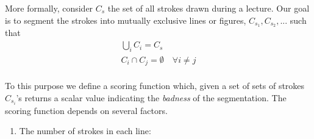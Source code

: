\documentclass{article}
\begin{document}
More formally, consider $C_s$ the set of all strokes drawn during a lecture. Our goal is to segment the strokes into mutually exclusive lines or figures, $C_{s_1}, C_{s_2}, ...$ such that 
\begin{align}
\bigcup \limits_{i} C_i = C_s\\
C_i \cap C_j = \emptyset\quad \forall i \ne j
\end{align} \\
To this purpose we define a scoring function which, given a set of sets of strokes $C_{s_i}$'s returns a scalar value indicating the \textit{badness} of the segmentation. The scoring function depends on several factors.
\\
\begin{enumerate}
\item The number of strokes in each line:
 

\end{enumerate}
\end{document}
